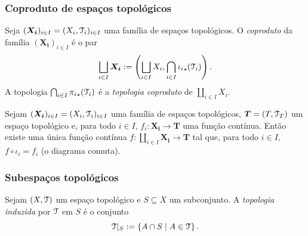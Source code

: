 \subsubsection{Coproduto de espaços topológicos}

\begin{definition}
Seja $(\bm{X_i})_{i \in I} = (X_i,\mathcal{T}_i)_{i \in I}$ uma família de espaços topológicos. O \emph{coproduto} da família $(\bm{X_i})_{i \in I}$ é o par
	\begin{equation*}
	\bigsqcup_{i \in I} \bm{X_i} := \left( \bigsqcup_{i \in I} X_i , \bigcap_{i \in I}{\iota_i}_\star(\mathcal{T}_i) \right).
	\end{equation*}
A topologia $\bigcap_{i \in I}{\pi_i}_\star(\mathcal{T}_i)$ é a \emph{topologia coproduto} de $\coprod_{i \in I} X_i$.
\end{definition}

\begin{proposition}
Sejam $(\bm{X_i})_{i \in I} = (X_i,\mathcal{T}_i)_{i \in I}$ uma família de espaços topológicos, $\bm T = (T,\mathcal{T}_T)$ um espaço topológico e, para todo $i \in I$, $f_i: \bm{X_i} \to \bm T$ uma função contínua. Então existe uma única função contínua $f: \coprod_{i \in I} \bm{X_i} \to \bm T$ tal que, para todo $i \in I$, $f \circ \iota_i = f_i$ (o diagrama comuta).
\begin{figure}
\centering
{}
\end{figure}
\end{proposition}

\subsubsection{Subespaços topológicos}

\begin{definition}
Sejam $(X,\mathcal{T})$ um espaço topológico e $S \subseteq X$ um subconjunto. A \emph{topologia induzida} por $\mathcal{T}$ em $S$ é o conjunto
	\begin{equation*}
	\mathcal{T}|_S := \left\{{A \cap S}\;\middle\vert\;{A \in \mathcal{T}}\right\}.
	\end{equation*}
\end{definition}

